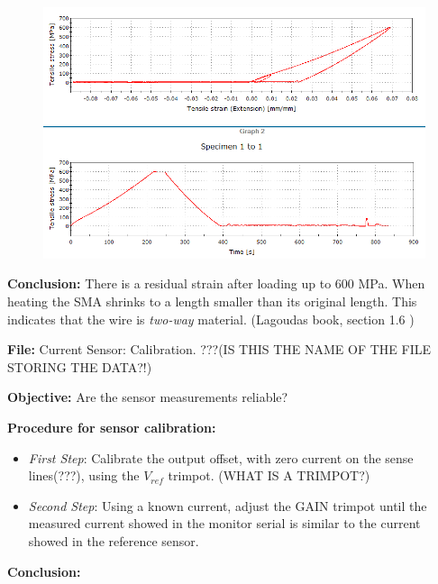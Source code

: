 \documentclass[idxtotoc,hyperref,openany]{labbook} %
\begin{document}
\begin{figure}[ht]
\centering
\includegraphics[width=\linewidth]{DYN1_hybrid_SME.png}
\end{figure}

\textbf{Conclusion:} There is a residual strain after loading up to 600 MPa. When heating the SMA shrinks to a length smaller than its original length. This indicates that the wire is \emph{two-way} material. (Lagoudas book, section 1.6 \cite{lagoudas_shape_2008})



\textbf{File:} Current Sensor: Calibration. ???(IS THIS THE NAME OF THE FILE STORING THE DATA?!)

\textbf{Objective:} Are the sensor measurements reliable?

\textbf{Procedure for sensor calibration:}

\begin{itemize}
\item \textit{First Step}: Calibrate the output offset, with zero current on the sense lines(???), using the $V_{ref}$ trimpot. (WHAT IS A TRIMPOT?)

\item \textit{Second Step}: Using a known current, adjust the GAIN trimpot until the measured current showed in the monitor serial is similar to the current showed in the reference sensor.
\end{itemize}
\textbf{Conclusion:} 
\end{document}
